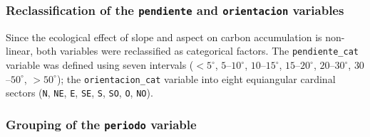 

\subsubsection{Reclassification of the \texttt{pendiente} and \texttt{orientacion} variables}

Since the ecological effect of slope and aspect on carbon accumulation is non-linear, both variables were reclassified as categorical factors. The \texttt{pendiente\_cat} variable was defined using seven intervals ($<5^\circ$, $5$--$10^\circ$, $10$--$15^\circ$, $15$--$20^\circ$, $20$--$30^\circ$, $30$--$50^\circ$, $>50^\circ$); the \texttt{orientacion\_cat} variable into eight equiangular cardinal sectors (\texttt{N}, \texttt{NE}, \texttt{E}, \texttt{SE}, \texttt{S}, \texttt{SO}, \texttt{O}, \texttt{NO}).

\subsubsection{Grouping of the \texttt{periodo} variable}

